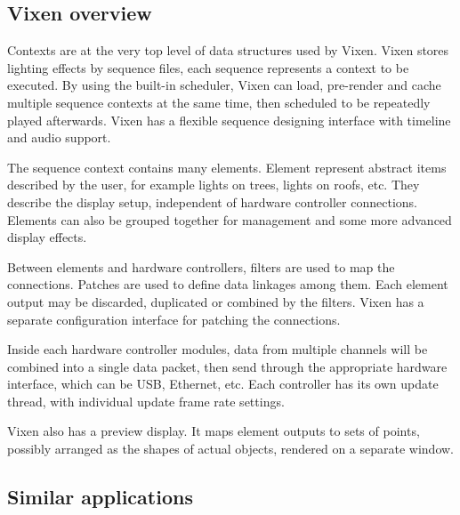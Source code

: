 \documentclass[journal]{IEEEtran}
\begin{document}


\subsection{Vixen overview}

Contexts are at the very top level of data structures used by Vixen. Vixen stores lighting effects by sequence files, each sequence represents a context to be executed. By using the built-in scheduler, Vixen can load, pre-render and cache multiple sequence contexts at the same time, then scheduled to be repeatedly played afterwards. Vixen has a flexible sequence designing interface with timeline and audio support.

The sequence context contains many elements. Element represent abstract items described by the user, for example lights on trees, lights on roofs, etc. They describe the display setup, independent of hardware controller connections. Elements can also be grouped together for management and some more advanced display effects.

Between elements and hardware controllers, filters are used to map the connections. Patches are used to define data linkages among them. Each element output may be discarded, duplicated or combined by the filters. Vixen has a separate configuration interface for patching the connections.

Inside each hardware controller modules, data from multiple channels will be combined into a single data packet, then send through the appropriate hardware interface, which can be USB, Ethernet, etc. Each controller has its own update thread, with individual update frame rate settings.

Vixen also has a preview display. It maps element outputs to sets of points, possibly arranged as the shapes of actual objects, rendered on a separate window.


\subsection{Similar applications}

\end{document}
